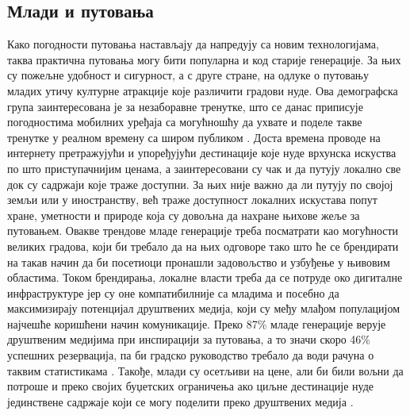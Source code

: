 \documentclass{article}
\begin{document}
\subsection{Млади и путовања}
Како погодности путовања настављају да напредују са новим технологијама, таква практична путовања могу бити популарна и код старије генерације. За њих су пожељне удобност и сигурност, а с друге стране, на одлуке о путовању младих утичу културне атракције које различити градови нуде. Ова демографска група заинтересована је за незаборавне тренутке, што се данас приписује погодностима мобилних уређаја са могућношћу да ухвате и поделе такве тренутке у реалном времену са широм публиком \cite{frommj}. Доста времена проводе на интернету претражујући и упоређујући дестинације које нуде врхунска искуства по што приступачнијим ценама, а заинтересовани су чак и да путују локално све док су садржаји које траже доступни. За њих није важно да ли путују по својој земљи или у иностранству, већ траже доступност локалних искустава попут хране, уметности и природе која су довољна да нахране њихове жеље за путовањем. Овакве трендове младе генерације треба посматрати као могућности великих градова, који би требало да на њих одговоре тако што ће се брендирати на такав начин да би посетиоци пронашли задовољство и узбуђење у њивовим областима. Током брендирања, локалне власти треба да се потруде око дигиталне инфраструктуре јер су оне компатибилније са младима и посебно да максимизирају потенцијал друштвених медија, који су међу млађом популацијом најчешће коришћени начин комуникације. Преко 87\% младе генерације верује друштвеним медијима при инспирацији за путовања, а то значи скоро 46\% успешних резервација, па би градско руководство требало да води рачуна о таквим статистикама \cite{oggA}. Такође, млади су осетљиви на цене, али би били вољни да потроше и преко својих буџетских ограничења ако циљне дестинације нуде јединствене садржаје који се могу поделити преко друштвених медија \cite{starcevic}.
\end{document}
